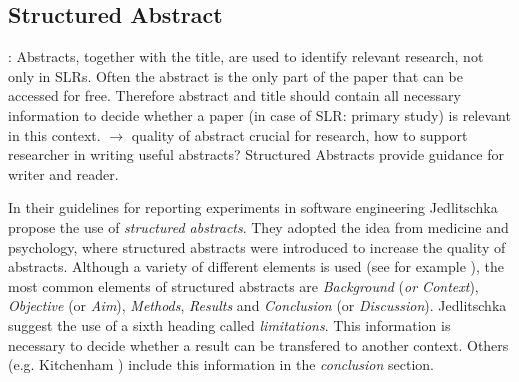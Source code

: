 
\subsection{Structured Abstract}
\label{subsec:structured abstract}

: Abstracts, together with the title, are used to identify relevant research, not only in SLRs. Often the abstract is the only part of the paper that can be accessed for free. Therefore abstract and title should contain all necessary information to decide whether a paper (in case of SLR: primary study) is relevant in this context. 
	$\rightarrow$ quality of abstract crucial for research, how to support researcher in writing useful abstracts? Structured Abstracts provide guidance for writer and reader. 
\newline

In their guidelines for reporting experiments in software engineering Jedlitschka \etal \cite{Jedlitschka2008} propose the use of \emph{structured abstracts}. They adopted the idea from medicine and psychology, where structured abstracts were introduced to increase the quality of abstracts. Although a variety of different elements is used (see for example ), the most common elements of structured abstracts are \emph{Background} (\emph{or Context}), \emph{Objective} (or \emph{Aim}), \emph{Methods}, \emph{Results} and \emph{Conclusion} (or \emph{Discussion}). Jedlitschka \etal \cite{Jedlitschka2008} suggest the use of a sixth heading called \emph{limitations}. This information is necessary to decide whether a result can be transfered to another context. Others (e.g. Kitchenham \etal \cite{KBO2008}) include this information in the \emph{conclusion} section.

